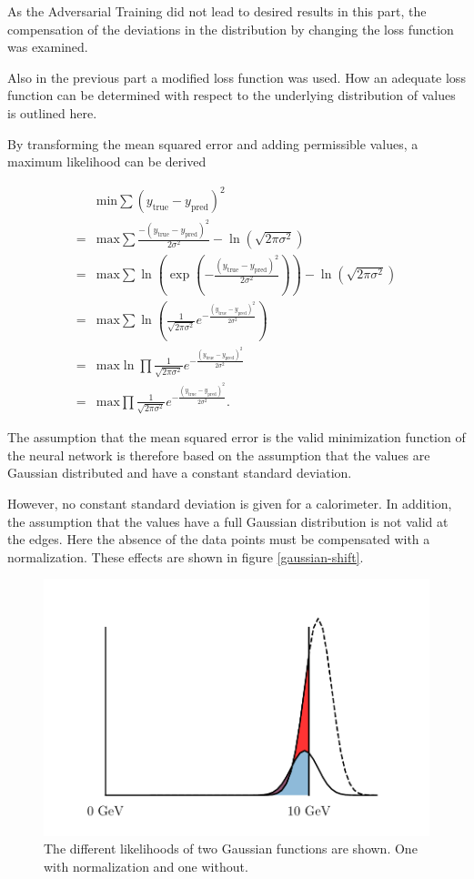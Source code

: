 \documentclass[12pt, a4paper]{thesis}
\begin{document}
As the Adversarial Training did not lead to desired results in this
part, the compensation of the deviations in the distribution by
changing the loss function was examined.

Also in the previous part a modified loss function was used.  How an
adequate loss function can be determined with respect to the
underlying distribution of values is outlined here.

By transforming the mean squared error and adding permissible values,
a maximum likelihood can be derived

\begin{align}
    &\text{min} \sum (y_{\text{true}}-y_{\text{pred}})^2 \\
    =&\text{max} \sum\frac{-(y_{\text{true}}-y_{\text{pred}})^2}{2 \sigma^2} - \ln(\sqrt{2\pi \sigma^2}) \\
    = &\text{max} \sum \ln(\exp(-\frac{(y_{\text{true}}-y_{\text{pred}})^2}{2 \sigma^2})) - \ln(\sqrt{2\pi \sigma^2}) \\
    = &\text{max} \sum \ln( \frac{1}{\sqrt{2\pi \sigma^2}} e^{-\frac{(y_{\text{true}}-y_{\text{pred}})^2}{2 \sigma^2}}) \\
    = &\text{max} \ln \prod \frac{1}{\sqrt{2\pi \sigma^2}} e^{-\frac{(y_{\text{true}}-y_{\text{pred}})^2}{2 \sigma^2}}\\
    = &\text{max} \prod \frac{1}{\sqrt{2\pi \sigma^2}} e^{-\frac{(y_{\text{true}}-y_{\text{pred}})^2}{2 \sigma^2}}.
\end{align}

The assumption that the mean squared error is the valid minimization
function of the neural network is therefore based on the assumption
that the values are Gaussian distributed and have a constant standard
deviation.

However, no constant standard deviation is given for a calorimeter. In
addition, the assumption that the values have a full Gaussian
distribution is not valid at the edges. Here the absence of the data
points must be compensated with a normalization. These effects are
shown in figure \ref{gaussian-shift}.

\begin{figure}[htbp]
\centering
\includegraphics[width=.9\linewidth]{../images/gaussian_shift.png}
\caption{\label{fig:org46d870f}
The different likelihoods of two Gaussian functions are shown. One with normalization and one without.}
\end{figure}
\end{document}
